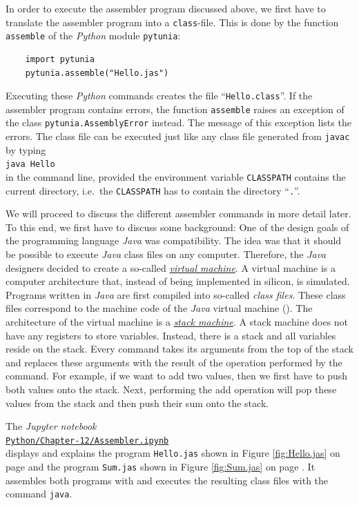 In order to execute the assembler program discussed above, we first have to translate the assembler
program into a \texttt{class}-file.  This is done by the function \texttt{assemble} of the
\textsl{Python} module \texttt{pytunia}:
\begin{verbatim}
    import pytunia
    pytunia.assemble("Hello.jas")
\end{verbatim}
Executing these \textsl{Python} commands creates the file ``\texttt{Hello.class}''.  If the assembler program
contains errors, the function \texttt{assemble} raises an exception of the class
\texttt{pytunia.AssemblyError} instead.  The message of this exception lists the errors.  The class file
can be executed just like any class file generated from \texttt{javac} by typing
\\[0.2cm]
\hspace*{1.3cm}
\texttt{java Hello}
\\[0.2cm]
in the command line, provided the environment variable \texttt{CLASSPATH} contains the current
directory, i.e.~the \texttt{CLASSPATH} has to contain the directory ``\texttt{.}''.

We will proceed to discuss the different assembler commands in more detail later.  To this end, we
first have to discuss some background: One of the design goals of the programming language
\textsl{Java} was compatibility.  The idea was 
that it should be possible to execute \textsl{Java} class files on any computer.  Therefore, the
\textsl{Java} designers decided to create a so-called 
\href{http://en.wikipedia.org/wiki/Virtual_machine}{\emph{virtual machine}}.  A virtual machine is
a computer architecture that, instead of being implemented in silicon, is simulated. 
Programs written in \textsl{Java} are first compiled into so-called \emph{class files}.  These class
files correspond to the machine code of the \textsl{Java} virtual machine ().  
The architecture of the virtual machine is a 
\href{http://en.wikipedia.org/wiki/Stack_machine}{\emph{stack machine}}. 
A stack machine does not have any registers to store variables.  Instead, there is a stack and all
variables reside on the stack.  Every command takes its arguments from the top of the stack and
replaces these arguments with the result of the operation performed by the command.
For example, if we want to add two values, then we first have to
push both values onto the stack.  Next, performing the add operation will pop these values from the
stack and then push their sum onto the stack.

The \textsl{Jupyter notebook}
\\[0.2cm]
\hspace*{1.3cm}
\href{https://github.com/karlstroetmann/Formal-Languages/blob/master/Python/Chapter-12/Assembler.ipynb}{\texttt{Python/Chapter-12/Assembler.ipynb}}
\\[0.2cm]
displays and explains the program \texttt{Hello.jas} shown in Figure \ref{fig:Hello.jas} on page
\pageref{fig:Hello.jas} and the program \texttt{Sum.jas} shown in Figure \ref{fig:Sum.jas} on page
\pageref{fig:Sum.jas}.  It assembles both programs with  and executes the resulting class
files with the command \texttt{java}.


